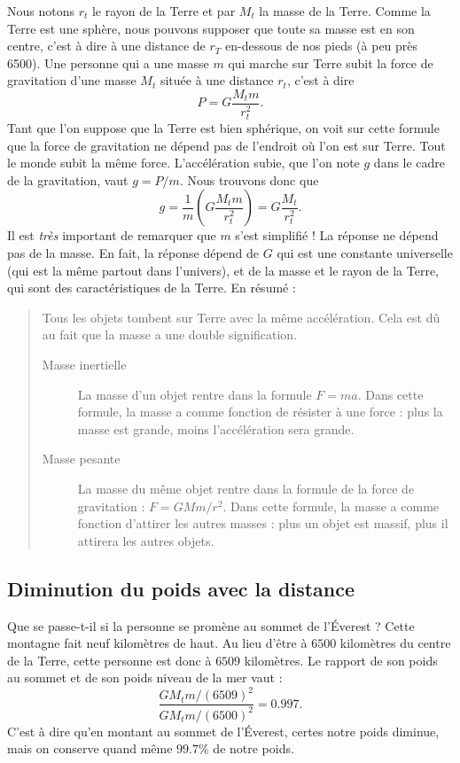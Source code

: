 Nous notons $r_t$ le rayon de la Terre et par $M_t$ la masse de la Terre. Comme la Terre est une sphère, nous pouvons supposer que toute sa masse est en son centre, c'est à dire à une distance de $r_T$ en-dessous de nos pieds (à peu près \unit{6500}{\kilo\meter}). Une personne qui a une masse $m$ qui marche sur Terre subit la force de gravitation d'une masse $M_t$ située à une distance $r_t$, c'est à dire
\[ 
  P=G\frac{ M_tm }{ r_t^2 }.
\]
Tant que l'on suppose que la Terre est bien sphérique, on voit sur cette formule que la force de gravitation ne dépend pas de l'endroit où l'on est sur Terre. Tout le monde subit la même force. L'accélération subie, que l'on note $g$ dans le cadre de la gravitation, vaut $g=P/m$. Nous trouvons donc que
\[ 
  g=\frac{1}{ m }\left( G\frac{ M_tm }{ r_t^2 }\right)=G\frac{ M_t }{ r_t^2 }.
\]
Il est \emph{très} important de remarquer que $m$ s'est simplifié ! La réponse ne dépend pas de la masse. En fait, la réponse dépend de $G$ qui est une constante universelle (qui est la même partout dans l'univers), et de la masse et le rayon de la Terre, qui sont des caractéristiques de la Terre. En résumé :
\begin{quote}
Tous les objets tombent sur Terre avec la même accélération. Cela est dû au fait que la masse a une double signification.
\begin{description}
\item[Masse inertielle] La masse d'un objet rentre dans la formule $F=ma$. Dans cette formule, la masse a comme fonction de résister à une force : plus la masse est grande, moins l'accélération sera grande.
\item[Masse pesante] La masse du même objet rentre dans la formule de la force de gravitation : $F=GMm/r^2$. Dans cette formule, la masse a comme fonction d'attirer les autres masses : plus un objet est massif, plus il attirera les autres objets. 
\end{description}
\end{quote}

\subsection{Diminution du poids avec la distance}

Que se passe-t-il si la personne se promène au sommet de l'Éverest ? Cette montagne fait neuf kilomètres de haut. Au lieu d'être à $6500$ kilomètres du centre de la Terre, cette personne est donc à $6509$ kilomètres. Le rapport de son poids au sommet et de son poids niveau de la mer vaut :
\[ 
  \frac{ GM_tm/(6509)^2 }{ GM_tm/(6500)^2 }=0.997.
\]
C'est à dire qu'en montant au sommet de l'Éverest, certes notre poids diminue, mais on conserve quand même $99.7\%$ de notre poids.

